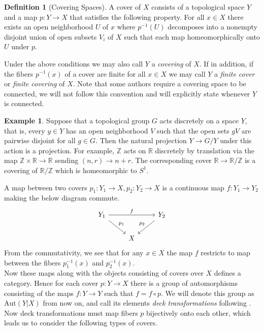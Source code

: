 \documentclass{article}
\theoremstyle{definition}
\newtheorem{definition}[theorem]{Definition}
\newtheorem{example}[theorem]{Example}
\theoremstyle{remark}
\newcommand{\R}{\mathbb{R}}
\newcommand{\Z}{\mathbb{Z}}
\begin{document}
\begin{definition}[Covering Spaces]
	A cover of $X$ consists of a topological space $Y$ and a map $p:Y \to X$ that satisfies the following property. 
	For all $x \in X$ there exists an open neighborhood $U$ of $x$ where $p^{-1}(U)$ decomposes into a nonempty disjoint union of open subsets $V_i$ of $X$ such that each map homeomorphically onto $U$ under $p$.
\end{definition}

Under the above conditions we may also call $Y$ a \textit{covering} of $X$.
If in addition, if the fibers $p^{-1}(x)$ of a cover are finite for all $x \in X$ we may call $Y$ a \textit{finite cover} or \textit{finite covering} of $X$.
Note that some authors require a covering space to be connected, we will not follow this convention and will explicitly state whenever $Y$ is connected.

\begin{example} Suppose that a topological group $G$ acts discretely on a space $Y$, that is, every $y \in Y$ has an open neighborhood $V$ such that the open sets $gV$ are pairwise disjoint for all $g  \in G$.
	Then the natural projection $Y \to G/Y$ under this action is a projection.
	For example, $\Z$ acts on $\R$ discretely by translation via the map $\Z \times \R \to \R$ sending $(n,r) \to n+r$.
	The corresponding cover $\R \to \R/\Z$ is a covering of $\R/\Z$ which is homeomorphic to $S^1$.
\end{example}

\indent A map between two covers $p_1: Y_1 \to X, p_2: Y_2 \to X$ is a continuous map $f: Y_1 \to Y_2$ making the below diagram commute.
\[\begin{tikzcd}
	{Y_1} && {Y_2} \\
	& X
	\arrow["f", from=1-1, to=1-3]
	\arrow["{p_1}", from=1-1, to=2-2]
	\arrow["{p_2}"', from=1-3, to=2-2]
\end{tikzcd}\]
From the commutativity, we see that for any $x \in X$ the map $f$ restricts to map between the fibers $p_1^{-1}(x)$ and $p_2^{-1}(x)$.\\
\indent Now these maps along with the objects consisting of covers over $X$ defines a category.
Hence for each cover $p:Y \to X$ there is a group of automorphisms consisting of the maps $f: Y \to Y$ such that $f = f \circ p$.
We will denote this group as $\text{Aut}(Y|X)$ from now on, and call its elements \textit{deck transformations} following \cite{FomenkoFuchs}.
Now deck transformations must map fibers $p$ bijectively onto each other, which leads us to consider the following types of covers.
\end{document}
